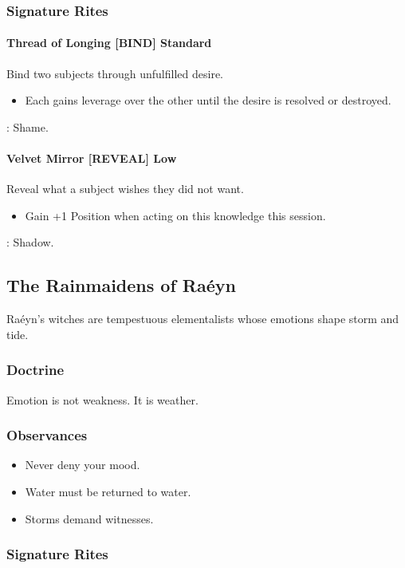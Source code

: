 \subsubsection*{Signature Rites}

\paragraph{Thread of Longing \hfill \textnormal{[BIND] Standard}}
Bind two subjects through unfulfilled desire.
\begin{itemize}
  \item Each gains leverage over the other until the desire is resolved or destroyed.
\end{itemize}
: Shame.

\paragraph{Velvet Mirror \hfill \textnormal{[REVEAL] Low}}
Reveal what a subject wishes they did not want.
\begin{itemize}
  \item Gain +1 Position when acting on this knowledge this session.
\end{itemize}
: Shadow.

\subsection{The Rainmaidens of Raéyn}
Raéyn's witches are tempestuous elementalists whose emotions shape storm and tide.

\subsubsection*{Doctrine}
Emotion is not weakness. It is weather.

\subsubsection*{Observances}
\begin{itemize}
  \item Never deny your mood.
  \item Water must be returned to water.
  \item Storms demand witnesses.
\end{itemize}

\subsubsection*{Signature Rites}


